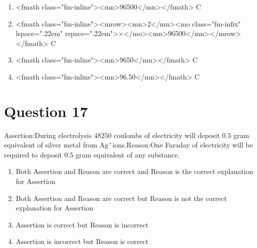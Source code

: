 \documentclass{article}
\begin{document}
\begin{enumerate}[label=(\alph*)]
\item <fmath class="fm-inline"><mn>96500</mn></fmath> C
\item <fmath class="fm-inline"><mrow><mn>2</mn><mo class="fm-infix" lspace=".22em" rspace=".22em">×</mo><mn>96500</mn></mrow></fmath> C
\item <fmath class="fm-inline"><mn>9650</mn></fmath> C
\item <fmath class="fm-inline"><mn>96.50</mn></fmath> C
\end{enumerate}
\newpage
\section*{Question 17}
Assertion:During electrolysis \(48250\) coulombs of electricity will deposit \(0.5\) gram equivalent of silver metal from \(\mathrm{Ag}^{+}\)ions.Reason:One Faraday of electricity will be required to deposit \(0.5\) gram equivalent of any substance.
\begin{enumerate}[label=(\alph*)]
\item Both Assertion and Reason are correct and Reason is the correct explanation for Assertion
\item Both Assertion and Reason are correct but Reason is not the correct explanation for Assertion
\item Assertion is correct but Reason is incorrect
\item Assertion is incorrect but Reason is correct
\end{enumerate}
\newpage
\end{document}
